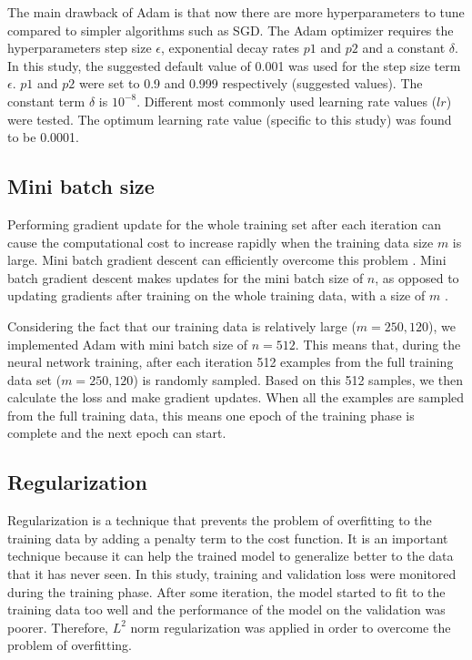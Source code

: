 \documentclass[a4paper, twoside]{templates/ociamthesis}
\begin{document}
The main drawback of Adam is that now there are more hyperparameters to tune compared to simpler algorithms such as SGD. The Adam optimizer requires the hyperparameters step size \(\epsilon\), exponential decay rates \(p1\) and \(p2\) and a constant \(\delta\). In this study, the suggested default value of 0.001 was used for the step size term \(\epsilon\). \(p1\) and \(p2\) were set to 0.9 and 0.999 respectively (suggested values). The constant term \(\delta\) is \(10^{-8}\). Different most commonly used learning rate values (\(lr\)) were tested. The optimum learning rate value (specific to this study) was found to be 0.0001.

\hypertarget{mini-batch-size}{%
\subsection{Mini batch size}\label{mini-batch-size}}

Performing gradient update for the whole training set after each iteration can cause the computational cost to increase rapidly when the training data size \(m\) is large. Mini batch gradient descent can efficiently overcome this problem \citep{goodfellow2016deep}. Mini batch gradient descent makes updates for the mini batch size of \(n\), as opposed to updating gradients after training on the whole training data, with a size of \(m\) \citep{ruder2016overview}.

Considering the fact that our training data is relatively large (\(m = 250,120\)), we implemented Adam with mini batch size of \(n = 512\). This means that, during the neural network training, after each iteration 512 examples from the full training data set (\(m = 250,120\)) is randomly sampled. Based on this 512 samples, we then calculate the loss and make gradient updates. When all the examples are sampled from the full training data, this means one epoch of the training phase is complete and the next epoch can start.

\hypertarget{regularization}{%
\subsection{Regularization}\label{regularization}}

Regularization is a technique that prevents the problem of overfitting to the training data by adding a penalty term to the cost function. It is an important technique because it can help the trained model to generalize better to the data that it has never seen. In this study, training and validation loss were monitored during the training phase. After some iteration, the model started to fit to the training data too well and the performance of the model on the validation was poorer. Therefore, \(L^{2}\) norm regularization was applied in order to overcome the problem of overfitting.
\end{document}
